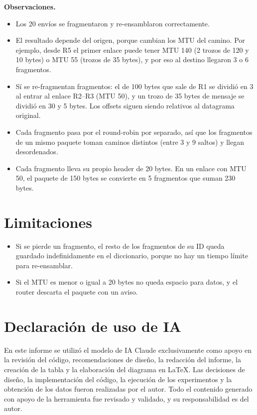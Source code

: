 \documentclass[11pt,letterpaper]{article}
\begin{document}
\textbf{Observaciones.}
\begin{itemize}[nosep]
  \item Los 20 envíos se fragmentaron y re-ensamblaron correctamente.
  \item El resultado depende del origen, porque cambian los MTU del camino. Por ejemplo,
        desde R5 el primer enlace puede tener MTU 140 (2 trozos de 120 y 10 bytes) o
        MTU 55 (trozos de 35 bytes), y por eso al destino llegaron 3 o 6 fragmentos.
  \item Sí se re-fragmentan fragmentos: el de 100 bytes que sale de R1 se dividió en 3 al
        entrar al enlace R2--R3 (MTU 50), y un trozo de 35 bytes de mensaje se dividió en
        30 y 5 bytes. Los offsets siguen siendo relativos al datagrama original.
  \item Cada fragmento pasa por el round-robin por separado, así que los fragmentos de un
        mismo paquete toman caminos distintos (entre 3 y 9 saltos) y llegan desordenados.
  \item Cada fragmento lleva su propio header de 20 bytes. En un enlace con MTU 50, el
        paquete de 150 bytes se convierte en 5 fragmentos que suman 230 bytes.
\end{itemize}

\section{Limitaciones}

\begin{itemize}[nosep]
  \item Si se pierde un fragmento, el resto de los fragmentos de su ID queda guardado
        indefinidamente en el diccionario, porque no hay un tiempo límite para
        re-ensamblar.
  \item Si el MTU es menor o igual a 20 bytes no queda espacio para datos, y el router
        descarta el paquete con un aviso.
\end{itemize}

\section*{Declaración de uso de IA}

En este informe se utilizó el modelo de IA Claude exclusivamente como apoyo en la
revisión del código, recomendaciones de diseño, la redacción del informe, la creación de
la tabla y la elaboración del diagrama en \LaTeX{}. Las decisiones de
diseño, la implementación del código, la ejecución de los experimentos y la obtención de
los datos fueron realizadas por el autor. Todo el contenido generado con apoyo de la
herramienta fue revisado y validado, y su responsabilidad es del autor.
\end{document}
